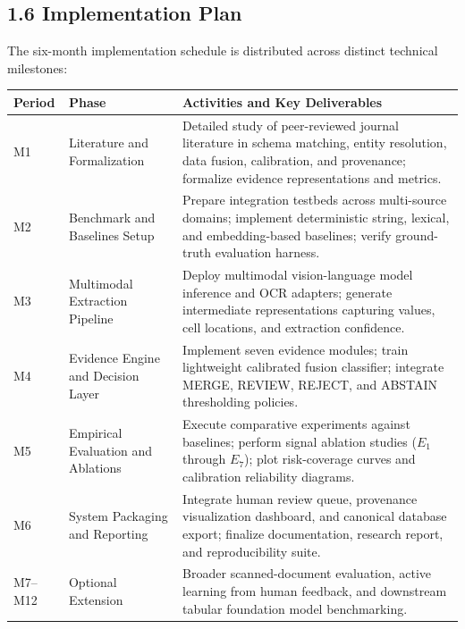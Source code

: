 \documentclass[12pt,a4paper]{article}
\begin{document}
\subsection*{1.6 Implementation Plan}

The six-month implementation schedule is distributed across distinct technical milestones:

\begin{center}
\small
\begin{tabularx}{\linewidth}{@{}p{1.1cm}p{3.2cm}X@{}}
\toprule
\textbf{Period} & \textbf{Phase} & \textbf{Activities and Key Deliverables} \\
\midrule
M1 & Literature and Formalization & Detailed study of peer-reviewed journal literature in schema matching, entity resolution, data fusion, calibration, and provenance; formalize evidence representations and metrics. \\
M2 & Benchmark and Baselines Setup & Prepare integration testbeds across multi-source domains; implement deterministic string, lexical, and embedding-based baselines; verify ground-truth evaluation harness. \\
M3 & Multimodal Extraction Pipeline & Deploy multimodal vision-language model inference and OCR adapters; generate intermediate representations capturing values, cell locations, and extraction confidence. \\
M4 & Evidence Engine and Decision Layer & Implement seven evidence modules; train lightweight calibrated fusion classifier; integrate MERGE, REVIEW, REJECT, and ABSTAIN thresholding policies. \\
M5 & Empirical Evaluation and Ablations & Execute comparative experiments against baselines; perform signal ablation studies ($E_1$ through $E_7$); plot risk-coverage curves and calibration reliability diagrams. \\
M6 & System Packaging and Reporting & Integrate human review queue, provenance visualization dashboard, and canonical database export; finalize documentation, research report, and reproducibility suite. \\
M7--M12 & Optional Extension & Broader scanned-document evaluation, active learning from human feedback, and downstream tabular foundation model benchmarking. \\
\bottomrule
\end{tabularx}
\end{center}

\end{document}
